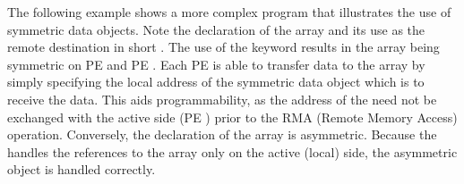 The following example shows a more complex \openshmem program that illustrates the use of symmetric data objects.  Note the declaration of the   array and its use as the remote destination in \openshmem short \PUT.  The use of the  keyword results in the  array being symmetric on \ac{PE}  and \ac{PE} .  Each \ac{PE} is able to transfer data to the \target{} array by simply specifying the local address of the symmetric data object which is to receive the data.  This aids programmability, as the address of the \target{} need not be exchanged with the active side (\ac{PE} ) prior to the RMA (Remote Memory Access) operation.  Conversely, the declaration of the  array is asymmetric.  Because the \PUT{} handles the references to the  array only on the active (local) side, the asymmetric \source{} object is handled correctly.

\begin{minipage}{\linewidth}
\vspace{0.1in}
\cbstart {} \cbend
{}
\vspace{0.1in}
\end{minipage}
